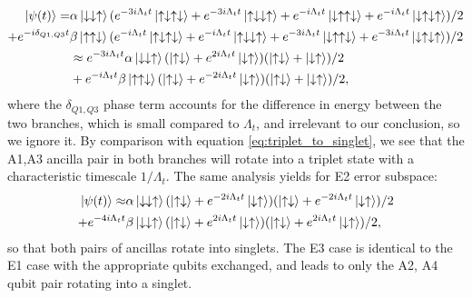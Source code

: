 \documentclass{report}
\begin{document}
\begin{appendices}
\begin{align*}
    \ket{\psi(t)} = &\alpha\ket{\downarrow\downarrow\uparrow}(
        e^{-3 i \Lambda_t t }\ket{\uparrow\downarrow\uparrow\downarrow} 
    + e^{-3 i \Lambda_t t }\ket{\uparrow\downarrow\downarrow\uparrow}
    + e^{-i \Lambda_t t }\ket{\downarrow\uparrow\uparrow\downarrow}
    + e^{-i \Lambda_t t }\ket{\downarrow\uparrow\downarrow\uparrow})/2 \\
    + e^{-i\delta_{Q1,Q3} t} &\beta\ket{\uparrow\uparrow\downarrow}(
        e^{- i \Lambda_t t }\ket{\uparrow\downarrow\uparrow\downarrow} 
    + e^{- i \Lambda_t t }\ket{\uparrow\downarrow\downarrow\uparrow}
    + e^{-3i \Lambda_t t }\ket{\downarrow\uparrow\uparrow\downarrow}
    + e^{-3i \Lambda_t t }\ket{\downarrow\uparrow\downarrow\uparrow})/2 \\
    &\approx e^{-3 i \Lambda_t t}\alpha\ket{\downarrow\downarrow\uparrow}
    (\ket{\uparrow\downarrow} + e^{2 i \Lambda_t t }\ket{\downarrow\uparrow})
    (\ket{\uparrow\downarrow} + \ket{\downarrow\uparrow})/2 \\
    &+ e^{- i \Lambda_t t}\beta\ket{\uparrow\uparrow\downarrow}
    (\ket{\uparrow\downarrow} + e^{-2 i \Lambda_t t }\ket{\downarrow\uparrow})
    (\ket{\uparrow\downarrow} + \ket{\downarrow\uparrow})/2,
\end{align*} where the $\delta_{Q1, Q3}$ phase term accounts for the difference in energy between the two branches, which is small compared to $\Lambda_t$, and irrelevant to our conclusion, so we ignore it. By comparison with equation \ref{eq:triplet_to_singlet}, we see that the A1,A3 ancilla pair in both branches will rotate into a triplet state with a characteristic timescale $1/\Lambda_t$. The same analysis yields for E2 error subspace:
\begin{align*}
    \ket{\psi(t)} \approx &\alpha\ket{\downarrow\downarrow\uparrow}
    (\ket{\uparrow\downarrow} + e^{ -2 i \Lambda_t t }\ket{\downarrow\uparrow})
    (\ket{\uparrow\downarrow} + e^{ -2 i \Lambda_t t }\ket{\downarrow\uparrow})/2 \\
    + e^{-4 i \Lambda_t t} &\beta\ket{\downarrow\downarrow\uparrow}
    (\ket{\uparrow\downarrow} + e^{ 2 i \Lambda_t t }\ket{\downarrow\uparrow})
    (\ket{\uparrow\downarrow} + e^{ 2 i \Lambda_t t }\ket{\downarrow\uparrow})/2,
\end{align*} so that both pairs of ancillas rotate into singlets. The E3 case is identical to the E1 case with the appropriate qubits exchanged, and leads to only the A2, A4 qubit pair rotating into a singlet.


\end{appendices}
\end{document}
